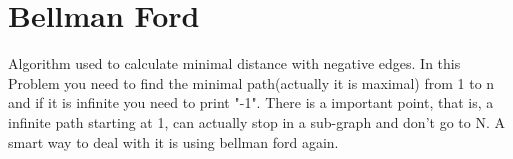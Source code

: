     
    \section{Bellman Ford}
        Algorithm used to calculate minimal distance with negative edges. In this Problem you need to find the minimal path(actually it is maximal) from 1 to n and if it is infinite you need to print "-1".
        There is a important point, that is, a infinite path starting at 1, can actually stop in a sub-graph and don't go to N. A smart way  to deal with it is using bellman ford again.

